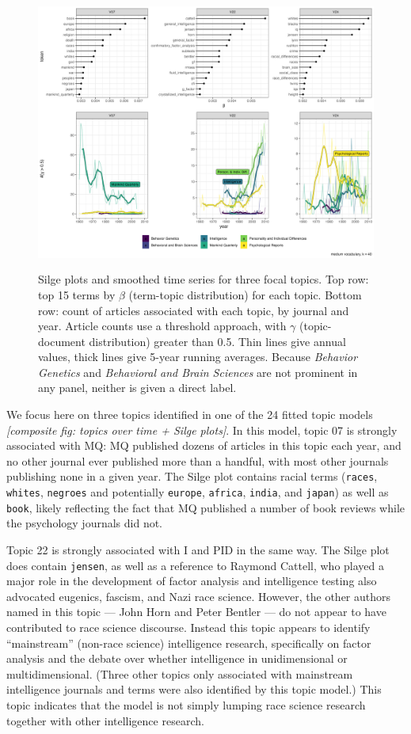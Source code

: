 \documentclass[12pt]{article}
\begin{document}
\begin{figure}
\centering
\includegraphics[width=4.76in,height=3.57in]{img/focal_topics.png}
\caption{Silge plots and smoothed time series for three focal topics. Top row: top 15 terms by \(\beta\) (term-topic distribution) for each topic. Bottom row: count of articles associated with each topic, by journal and year. Article counts use a threshold approach, with \(\gamma\) (topic-document distribution) greater than 0.5. Thin lines give annual values, thick lines give 5-year running averages. Because \emph{Behavior Genetics} and \emph{Behavioral and Brain Sciences} are not prominent in any panel, neither is given a direct label.}
\end{figure}

We focus here on three topics identified in one of the 24 fitted topic models \emph{{[}composite fig: topics over time + Silge plots{]}}. In this model, topic 07 is strongly associated with MQ: MQ published dozens of articles in this topic each year, and no other journal ever published more than a handful, with most other journals publishing none in a given year. The Silge plot contains racial terms (\texttt{races}, \texttt{whites}, \texttt{negroes} and potentially \texttt{europe}, \texttt{africa}, \texttt{india}, and \texttt{japan}) as well as \texttt{book}, likely reflecting the fact that MQ published a number of book reviews while the psychology journals did not.

Topic 22 is strongly associated with I and PID in the same way. The Silge plot does contain \texttt{jensen}, as well as a reference to Raymond Cattell, who played a major role in the development of factor analysis and intelligence testing also advocated eugenics, fascism, and Nazi race science\cite{MehlerBeyondismRaymondCattell1997}. However, the other authors named in this topic --- John Horn and Peter Bentler --- do not appear to have contributed to race science discourse. Instead this topic appears to identify ``mainstream'' (non-race science) intelligence research, specifically on factor analysis and the debate over whether intelligence in unidimensional or multidimensional. (Three other topics only associated with mainstream intelligence journals and terms were also identified by this topic model.) This topic indicates that the model is not simply lumping race science research together with other intelligence research.
\end{document}
